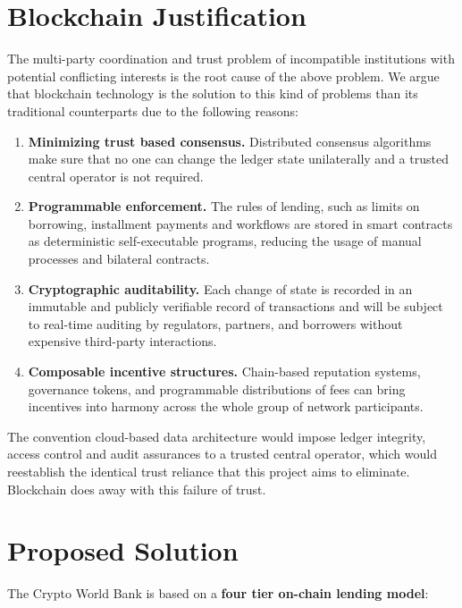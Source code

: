 \documentclass[12pt,a4paper]{report}
\begin{document}
\section{Blockchain Justification}

The multi-party coordination and trust problem of incompatible institutions with potential conflicting interests is the root cause of the above problem. We argue that blockchain technology is the solution to this kind of problems than its traditional counterparts due to the following reasons:

\begin{enumerate}[noitemsep]
\item \textbf{Minimizing trust based consensus.} Distributed consensus algorithms make sure that no one can change the ledger state unilaterally and a trusted central operator is not required.

\item \textbf{Programmable enforcement.} The rules of lending, such as limits on borrowing, installment payments and workflows are stored in smart contracts as deterministic self-executable programs, reducing the usage of manual processes and bilateral contracts.

\item \textbf{Cryptographic auditability.} Each change of state is recorded in an immutable and publicly verifiable record of transactions and will be subject to real-time auditing by regulators, partners, and borrowers without expensive third-party interactions.

\item \textbf{Composable incentive structures.} Chain-based reputation systems, governance tokens, and programmable distributions of fees can bring incentives into harmony across the whole group of network participants.
\end{enumerate}

The convention cloud-based data architecture would impose ledger integrity, access control and audit assurances to a trusted central operator, which would reestablish the identical trust reliance that this project aims to eliminate. Blockchain does away with this failure of trust.

\section{Proposed Solution}

The Crypto World Bank is based on a \textbf{four tier on-chain lending model}:
\end{document}
